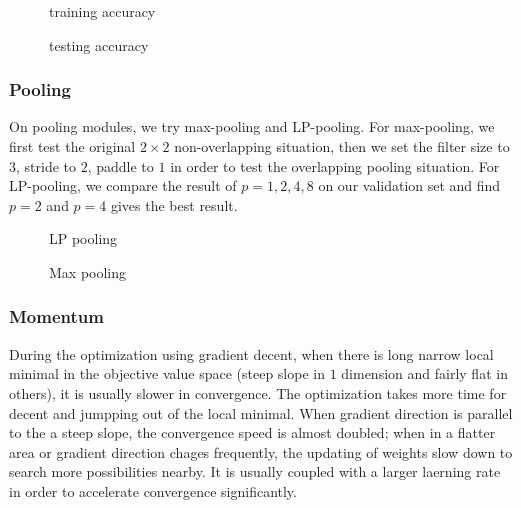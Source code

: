 \documentclass[paper=a4, fontsize=11pt]{scrartcl} %
\numberwithin{equation}{section} %
\numberwithin{figure}{section} %
\numberwithin{table}{section} %
\begin{document}
\begin{figure}[h]
\caption{training accuracy}
\end{figure}

\begin{figure}[h]
\caption{testing accuracy}
\end{figure}
\newpage
\subsubsection{\textbf{Pooling}}
On pooling modules, we try max-pooling and LP-pooling. For max-pooling, we first test the original $2 \times 2$ non-overlapping situation, then we set the filter size to $3$, stride to $2$, paddle to $1$ in order to test the overlapping pooling situation. For LP-pooling, we compare the result of $p = 1, 2, 4, 8$ on our validation set and find $p = 2$ and $p = 4$ gives the best result. 
\begin{figure}[h]
\subfigure[L2 pooling]{
\texttt{[image: L2te]}
}
\subfigure[L4 pooling]{
\texttt{[image: L4te]}
}
\caption{LP pooling}
\end{figure}

\begin{figure}[h]
\caption{Max pooling}
\end{figure}
\newpage
\subsubsection{\textbf{Momentum}}
During the optimization using gradient decent, when there is long narrow local minimal in the objective value space (steep slope in $1$ dimension and fairly flat in others), it is usually slower in convergence. The optimization takes more time for decent and jumpping out of the local minimal. When gradient direction is parallel to the a steep slope, the convergence speed is almost doubled; when in a flatter area or gradient direction chages frequently, the updating of weights slow down to search more possibilities nearby. It is usually coupled with a larger laerning rate in order to accelerate convergence significantly.
\end{document}

